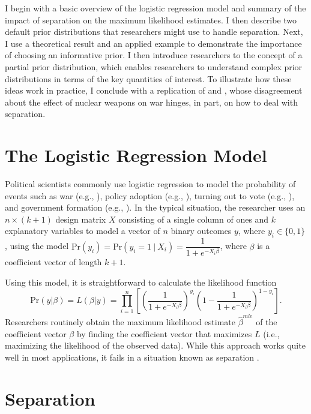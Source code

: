\documentclass[12pt]{article}
\begin{document}
I begin with a basic overview of the logistic regression model and summary of the impact of separation on the maximum likelihood estimates. 
I then describe two default prior distributions that researchers might use to handle separation. 
Next, I use a theoretical result and an applied example to demonstrate the importance of choosing an informative prior. 
I then introduce researchers to the concept of a partial prior distribution, which enables researchers to understand complex prior distributions in terms of the key quantities of interest. 
To illustrate how these ideas work in practice, I conclude with a replication of \cite{Rauchhaus2009} and \cite{BellMiller2015}, whose disagreement about the effect of nuclear weapons on war hinges, in part, on how to deal with separation.

\section*{The Logistic Regression Model}

Political scientists commonly use logistic regression to model the probability of events such as war (e.g., \citealt{Fearon1994}), policy adoption (e.g., \citealt{BerryBerry1990}), turning out to vote (e.g., \citealt{WolfingerRosenstone1980}), and government formation (e.g., \citealt{MartinStevenson2001}). 
In the typical situation, the researcher uses an $n \times (k + 1)$ design matrix $X$ consisting of a single column of ones and $k$ explanatory variables to model a vector of $n$ binary outcomes $y$, where $y_i \in \{0, 1\}$, using the model $\text{Pr}(y_i) = \text{Pr}(y_i = 1~|~ X_i) = \dfrac{1}{1 + e^{-X_i\beta}}$, where $\beta$ is a coefficient vector of length $k + 1$. 

Using this model, it is straightforward to calculate the likelihood function 
\begin{equation}
\text{Pr}(y | \beta) = L(\beta | y) = \displaystyle \prod_{i = 1}^n \left[\left( \dfrac{1}{1 + e^{-X_i\beta}}\right)^{y_i}\left(1 - \dfrac{1}{1 + e^{-X_i\beta}}\right)^{1 - y_i}\right]\text{.}
\end{equation}
Researchers routinely obtain the maximum likelihood estimate $\hat{\beta}^{mle}$ of the coefficient vector $\beta$ by finding the coefficient vector that maximizes $L$ (i.e., maximizing the likelihood of the observed data). 
While this approach works quite well in most applications, it fails in a situation known as separation \citep{Zorn2005}.

\section*{Separation}
\end{document}
